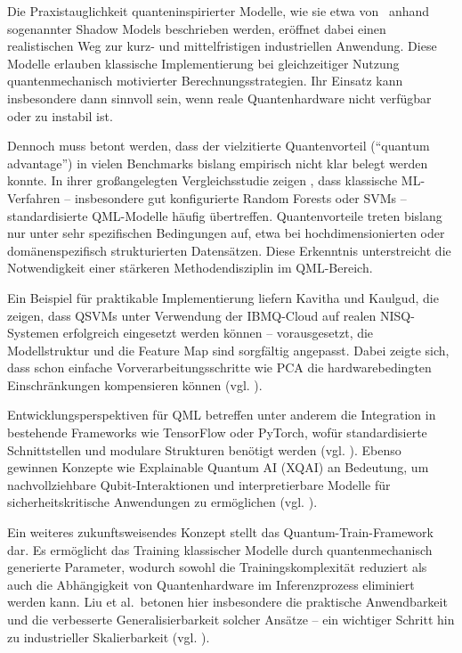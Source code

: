 Die Praxistauglichkeit quanteninspirierter Modelle, wie sie etwa von \cite{jerbiShadowsQuantumMachine2024} \ anhand sogenannter Shadow Models beschrieben werden, eröffnet dabei einen realistischen Weg zur kurz- und mittelfristigen industriellen Anwendung. Diese Modelle erlauben klassische Implementierung bei gleichzeitiger Nutzung quantenmechanisch motivierter Berechnungsstrategien. Ihr Einsatz kann insbesondere dann sinnvoll sein, wenn reale Quantenhardware nicht verfügbar oder zu instabil ist.

Dennoch muss betont werden, dass der vielzitierte Quantenvorteil (``quantum advantage'') in vielen Benchmarks bislang empirisch nicht klar belegt werden konnte. In ihrer großangelegten Vergleichsstudie zeigen \cite{bowlesBetterClassicalSubtle2024a}, dass klassische ML-Verfahren – insbesondere gut konfigurierte Random Forests oder SVMs – standardisierte QML-Modelle häufig übertreffen. Quantenvorteile treten bislang nur unter sehr spezifischen Bedingungen auf, etwa bei hochdimensionierten oder domänenspezifisch strukturierten Datensätzen. Diese Erkenntnis unterstreicht die Notwendigkeit einer stärkeren Methodendisziplin im QML-Bereich.

Ein Beispiel für praktikable Implementierung liefern Kavitha und Kaulgud, die zeigen, dass QSVMs unter Verwendung der IBMQ-Cloud auf realen NISQ-Systemen erfolgreich eingesetzt werden können – vorausgesetzt, die Modellstruktur und die Feature Map sind sorgfältig angepasst. Dabei zeigte sich, dass schon einfache Vorverarbeitungsschritte wie PCA die hardwarebedingten Einschränkungen kompensieren können (vgl. \cite{kavithaQuantumMachineLearning2024}).

Entwicklungsperspektiven für QML betreffen unter anderem die Integration in bestehende Frameworks wie TensorFlow oder PyTorch, wofür standardisierte Schnittstellen und modulare Strukturen benötigt werden (vgl. \cite{gujjuQuantumMachineLearning2024}).
Ebenso gewinnen Konzepte wie Explainable Quantum AI (XQAI) an Bedeutung, um nachvollziehbare Qubit-Interaktionen und interpretierbare Modelle für sicherheitskritische Anwendungen zu ermöglichen (vgl. \cite{jerbiShadowsQuantumMachine2024}).

Ein weiteres zukunftsweisendes Konzept stellt das Quantum-Train-Framework dar. Es ermöglicht das Training klassischer Modelle durch quantenmechanisch generierte Parameter, wodurch sowohl die Trainingskomplexität reduziert als auch die Abhängigkeit von Quantenhardware im Inferenzprozess eliminiert werden kann. Liu et al.\ betonen hier insbesondere die praktische Anwendbarkeit und die verbesserte Generalisierbarkeit solcher Ansätze – ein wichtiger Schritt hin zu industrieller Skalierbarkeit (vgl. \cite{liuQuantumTrainRethinkingHybrid2024}).

